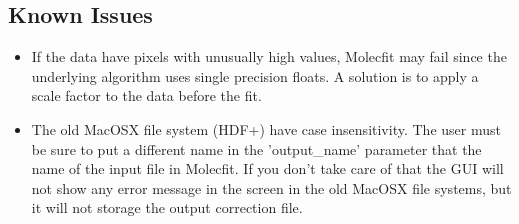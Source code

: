 \subsection{Known Issues}\label{sec:issues}
\begin{itemize}
  \item If the data have pixels with unusually high values, Molecfit may fail since the
        underlying algorithm uses single precision floats.  A solution is to apply a
        scale factor to the data before the fit.
  \item The old MacOSX file system (HDF+) have case insensitivity. The user must be 
        sure to put a different name in the 'output\_name' parameter that the name of
        the input file in Molecfit. If you don't take care of that the GUI will not
        show any error message in the screen in the old MacOSX file systems, 
        but it will not storage the output correction file.  
\end{itemize}
